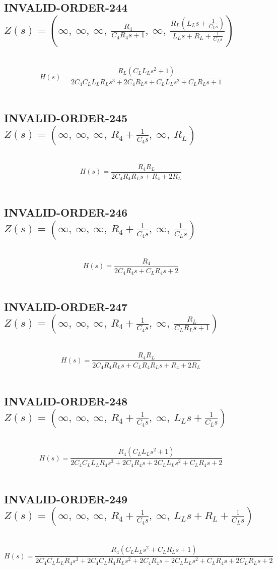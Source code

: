 \documentclass{article}
\begin{document}
\subsection{INVALID-ORDER-244 $Z(s) = \left( \infty, \  \infty, \  \infty, \  \frac{R_{4}}{C_{4} R_{4} s + 1}, \  \infty, \  \frac{R_{L} \left(L_{L} s + \frac{1}{C_{L} s}\right)}{L_{L} s + R_{L} + \frac{1}{C_{L} s}}\right)$ } \ 
\textbf{\[H(s) = \frac{R_{L} \left(C_{L} L_{L} s^{2} + 1\right)}{2 C_{4} C_{L} L_{L} R_{L} s^{3} + 2 C_{4} R_{L} s + C_{L} L_{L} s^{2} + C_{L} R_{L} s + 1}\] } \ 
\subsection{INVALID-ORDER-245 $Z(s) = \left( \infty, \  \infty, \  \infty, \  R_{4} + \frac{1}{C_{4} s}, \  \infty, \  R_{L}\right)$ } \ 
\textbf{\[H(s) = \frac{R_{4} R_{L}}{2 C_{4} R_{4} R_{L} s + R_{4} + 2 R_{L}}\] } \ 
\subsection{INVALID-ORDER-246 $Z(s) = \left( \infty, \  \infty, \  \infty, \  R_{4} + \frac{1}{C_{4} s}, \  \infty, \  \frac{1}{C_{L} s}\right)$ } \ 
\textbf{\[H(s) = \frac{R_{4}}{2 C_{4} R_{4} s + C_{L} R_{4} s + 2}\] } \ 
\subsection{INVALID-ORDER-247 $Z(s) = \left( \infty, \  \infty, \  \infty, \  R_{4} + \frac{1}{C_{4} s}, \  \infty, \  \frac{R_{L}}{C_{L} R_{L} s + 1}\right)$ } \ 
\textbf{\[H(s) = \frac{R_{4} R_{L}}{2 C_{4} R_{4} R_{L} s + C_{L} R_{4} R_{L} s + R_{4} + 2 R_{L}}\] } \ 
\subsection{INVALID-ORDER-248 $Z(s) = \left( \infty, \  \infty, \  \infty, \  R_{4} + \frac{1}{C_{4} s}, \  \infty, \  L_{L} s + \frac{1}{C_{L} s}\right)$ } \ 
\textbf{\[H(s) = \frac{R_{4} \left(C_{L} L_{L} s^{2} + 1\right)}{2 C_{4} C_{L} L_{L} R_{4} s^{3} + 2 C_{4} R_{4} s + 2 C_{L} L_{L} s^{2} + C_{L} R_{4} s + 2}\] } \ 
\subsection{INVALID-ORDER-249 $Z(s) = \left( \infty, \  \infty, \  \infty, \  R_{4} + \frac{1}{C_{4} s}, \  \infty, \  L_{L} s + R_{L} + \frac{1}{C_{L} s}\right)$ } \ 
\textbf{\[H(s) = \frac{R_{4} \left(C_{L} L_{L} s^{2} + C_{L} R_{L} s + 1\right)}{2 C_{4} C_{L} L_{L} R_{4} s^{3} + 2 C_{4} C_{L} R_{4} R_{L} s^{2} + 2 C_{4} R_{4} s + 2 C_{L} L_{L} s^{2} + C_{L} R_{4} s + 2 C_{L} R_{L} s + 2}\] } \ 
\end{document}
